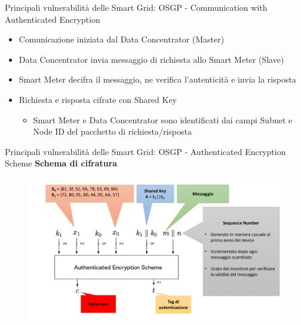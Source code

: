 \begin{frame}{Principali vulnerabilità delle Smart Grid: OSGP - Communication with Authenticated Encryption}
	\begin{itemize}[<+- | alert@+>]
		\item Comunicazione iniziata dal Data Concentrator (Master)
		\item Data Concentrator invia messaggio di richiesta allo Smart Meter (Slave)
		\item Smart Meter decifra il messaggio, ne verifica l'autenticità e invia la risposta
		\item Richiesta e risposta cifrate con Shared Key
		\begin{itemize}
			\item Smart Meter e Data Concentrator sono identificati dai campi Subnet e Node ID del pacchetto di richiesta/risposta
		\end{itemize}
	\end{itemize}
\end{frame}

\begin{frame}{Principali vulnerabilità delle Smart Grid: OSGP - Authenticated Encryption Scheme}
	\textbf{Schema di cifratura}
	\begin{figure}[h] 
		\includegraphics[scale=0.3,cfbox=blue_slides 1pt 0pt]{imgs/schemes/blackbox-1.png}
	\end{figure}
\end{frame}

